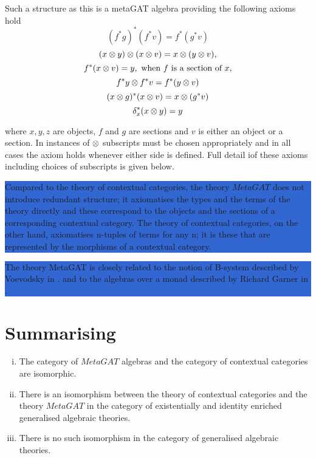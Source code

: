 \documentclass[10pt,a4paper]{article}
\newcommand{\highlightpara}[1]{\colorbox{highlight}{%
    \parbox{\dimexpr\linewidth-2\fboxsep}%
        {#1}}
}
\begin{document}
Such a structure as this is a metaGAT algebra providing the following axioms hold  
\begin{equation}
(f^*g)^*(f^*v) = f^*(g^*v)
\end{equation}
\begin{equation}
(x \otimes y) \otimes (x \otimes v) = x \otimes (y \otimes v), 
\end{equation}
\begin{equation}
f^*(x \otimes v) = y, \mbox{ when $f$ is a section of $x$,} 
\end{equation}
\begin{equation}
f^*y \otimes f^*v = f^*(y \otimes v)
\end{equation}
\begin{equation}
(x \otimes g)^*(x \otimes v)=x \otimes(g^*v)
\end{equation}
\begin{equation}
\delta_x ^*(x \otimes y)=y
\end{equation}

where $x, y, z$ are objects, $f$ and $g$ are sections and $v$ is either an object or a section. In instances of $\otimes$ subscripts must be chosen appropriately
and in all cases the axiom holds whenever either side is defined. Full detail iof these axioms including choices of subscripts is given below.

\iffalse
We can visualise the first of these axioms like this: 

\fi

\noindent
\highlightpara{
Compared to the theory of contextual categories, the theory $MetaGAT$ does not introduce redundant structure; it axiomatises the types and the terms of the theory directly and these correspond to the objects and the sections of a corresponding contextual category. The theory of contextual categories, on the other hand, axiomatises n-tuples of terms for any n; it is  these that are represented by the morphisms of a contextual category.}  

\noindent
\highlightpara{
The theory MetaGAT is closely related to the notion of B-system described by Voevodsky in
\cite{Voevodsky14B}.
and to the algebras over a monad described by Richard Garner in \cite{Garner15}.  
}
\section{Summarising}

\begin{enumerate}[(i)]
\item The category of $MetaGAT$ algebras and the category of contextual categories are isomorphic. 
\item There is an isomorphism between the theory of contextual categories and the theory $MetaGAT$ in the category of existentially and identity enriched generalised algebraic theories. 
\item There is no such isomorphism in the category of generalised algebraic theories.
\end{enumerate}
\end{document}
